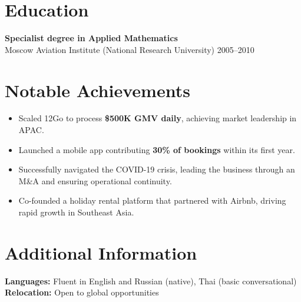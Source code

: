 \documentclass[11pt,a4paper]{article}
\begin{document}
\section*{Education}
\textbf{Specialist degree in Applied Mathematics} \\
Moscow Aviation Institute (National Research University) \hfill 2005--2010

\section*{Notable Achievements}
\begin{itemize}
    \item Scaled 12Go to process \textbf{\$500K GMV daily}, achieving market leadership in APAC.
    \item Launched a mobile app contributing \textbf{30\% of bookings} within its first year.
    \item Successfully navigated the COVID-19 crisis, leading the business through an M\&A and ensuring operational continuity.
    \item Co-founded a holiday rental platform that partnered with Airbnb, driving rapid growth in Southeast Asia.
\end{itemize}

\section*{Additional Information}
\textbf{Languages:} Fluent in English and Russian (native), Thai (basic conversational) \\
\textbf{Relocation:} Open to global opportunities
\end{document}
